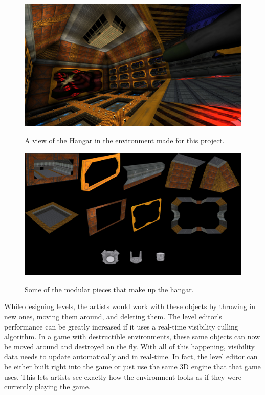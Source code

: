 \documentclass[12pt]{ucthesis}
\newcommand{\captionfonts}{\small\bf\ssp}
\begin{document}
\begin{figure}
\begin{center}
\includegraphics[width=\textwidth]{Images/Hangar.jpg}
\captionfonts
\caption[Hangar]{A view of the Hangar in the environment made for this project.}
\label{fig:hangar-view}
\includegraphics[width=\textwidth]{Images/Peices.jpg}
\captionfonts
\caption[Hangar Modular Pieces]{Some of the modular pieces that make up the hangar.}
\label{fig:hangar-peices}
\end{center}
\end{figure}

While designing levels, the artists would work with these objects by throwing in new ones, moving them around, and deleting them.
The level editor's performance can be greatly increased if it uses a real-time visibility culling  algorithm.
In a game with destructible environments, these same objects can now be moved around and destroyed on the fly.
With all of this happening, visibility data needs to update automatically and in real-time.
In fact, the level editor can be either built right into the game or just use the same 3D engine that that game uses.
This lets artists see exactly how the environment looks as if they were currently playing the game.
\end{document}
